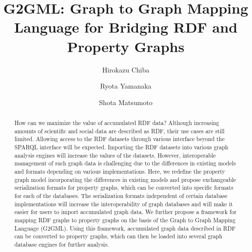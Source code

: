 \documentclass[runningheads]{llncs}
\begin{document}
\newtheorem{defi}[theorem]{Definition}
\newtheorem*{prel}{Preliminaries}
%
\title{G2GML: Graph to Graph Mapping Language for Bridging RDF and Property Graphs}
%
%
\author{Hirokazu Chiba \and Ryota Yamanaka \and Shota Matsumoto}
%
%
%
\maketitle              %
%
\begin{abstract}
How can we maximize the value of accumulated RDF data? Although increasing amounts of scientific and social data are described as RDF, their use cases are still limited. Allowing access to the RDF datasets through various interface beyond the SPARQL interface will be expected. Importing the RDF datasets into various graph analysis engines will increase the values of the datasets.  
However, interoperable management of such graph data is challenging due to the differences in existing models and formats depending on various implementations. Here, we redefine the property graph model incorporating the differences in existing models and propose exchangeable serialization formats for property graphs, which can be converted into specific formats for each of the databases. 
The serialization formats independent of certain database implementations will increase the interoperability of graph databases and will make it easier for users to import accumulated graph data.
We further propose a framework for mapping RDF graphs to property graphs on the basis of the Graph to Graph Mapping Language (G2GML). Using this framework, accumulated graph data described in RDF can be converted to property graphs, which can then be loaded into several graph database engines for further analysis. 

\end{abstract}
\end{document}
